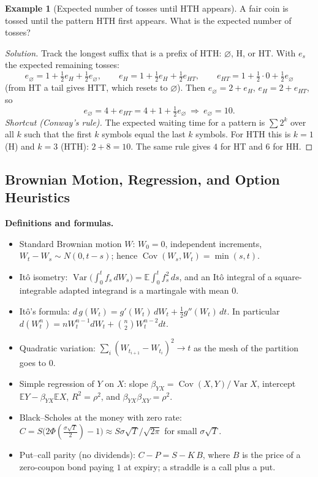 \documentclass[11pt]{article}
\theoremstyle{definition}
\newtheorem{example}{Example}[section]
\newcommand{\E}{\mathbb{E}}
\newcommand{\Var}{\operatorname{Var}}
\newcommand{\Cov}{\operatorname{Cov}}
\begin{document}
\begin{example}[Expected number of tosses until HTH appears]
A fair coin is tossed until the pattern HTH first appears. What is the expected number of tosses?
\end{example}

\begin{proof}[Solution]
Track the longest suffix that is a prefix of HTH: $\varnothing$, H, or HT. With $e_s$ the expected remaining tosses:
\[
e_\varnothing=1+\tfrac12e_H+\tfrac12e_\varnothing,\qquad e_H=1+\tfrac12e_H+\tfrac12e_{HT},\qquad e_{HT}=1+\tfrac12\cdot0+\tfrac12e_\varnothing
\]
(from HT a tail gives HTT, which resets to $\varnothing$). Then $e_\varnothing=2+e_H$, $e_H=2+e_{HT}$, so
\[
e_\varnothing=4+e_{HT}=4+1+\tfrac12e_\varnothing\ \Longrightarrow\ e_\varnothing=\boxed{10}.
\]
\emph{Shortcut (Conway's rule).} The expected waiting time for a pattern is $\sum 2^k$ over all $k$ such that the first $k$ symbols equal the last $k$ symbols. For HTH this is $k=1$ (H) and $k=3$ (HTH): $2+8=10$. The same rule gives $4$ for HT and $6$ for HH.
\end{proof}

\subsection{Brownian Motion, Regression, and Option Heuristics}
\textbf{Definitions and formulas.}
\begin{itemize}
    \item Standard Brownian motion $W$: $W_0=0$, independent increments, $W_t-W_s\sim N(0,t-s)$; hence $\Cov(W_s,W_t)=\min(s,t)$.
    \item It\^o isometry: $\Var\!\bigl(\int_0^t f_s\,dW_s\bigr)=\E\!\int_0^t f_s^2\,ds$, and an It\^o integral of a square-integrable adapted integrand is a martingale with mean $0$.
    \item It\^o's formula: $d\,g(W_t)=g'(W_t)\,dW_t+\tfrac12g''(W_t)\,dt$. In particular $d(W_t^n)=nW_t^{n-1}dW_t+\binom n2W_t^{n-2}dt$.
    \item Quadratic variation: $\sum_i(W_{t_{i+1}}-W_{t_i})^2\to t$ as the mesh of the partition goes to $0$.
    \item Simple regression of $Y$ on $X$: slope $\beta_{YX}=\Cov(X,Y)/\Var X$, intercept $\E Y-\beta_{YX}\E X$, $R^2=\rho^2$, and $\beta_{YX}\beta_{XY}=\rho^2$.
    \item Black--Scholes at the money with zero rate: $C=S\bigl(2\Phi(\tfrac{\sigma\sqrt T}2)-1\bigr)\approx S\sigma\sqrt T/\sqrt{2\pi}$ for small $\sigma\sqrt T$.
    \item Put--call parity (no dividends): $C-P=S-K\,B$, where $B$ is the price of a zero-coupon bond paying $1$ at expiry; a straddle is a call plus a put.
\end{itemize}
\end{document}
